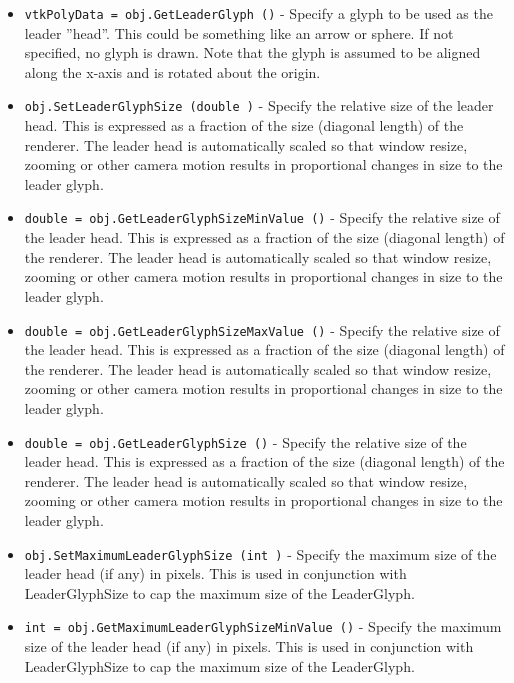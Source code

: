 \begin{itemize}
\item  \verb|vtkPolyData = obj.GetLeaderGlyph ()| -  Specify a glyph to be used as the leader ''head''. This could be something
 like an arrow or sphere. If not specified, no glyph is drawn. Note that
 the glyph is assumed to be aligned along the x-axis and is rotated about
 the origin.

\item  \verb|obj.SetLeaderGlyphSize (double )| -  Specify the relative size of the leader head. This is expressed as a
 fraction of the size (diagonal length) of the renderer. The leader
 head is automatically scaled so that window resize, zooming or other 
 camera motion results in proportional changes in size to the leader
 glyph.

\item  \verb|double = obj.GetLeaderGlyphSizeMinValue ()| -  Specify the relative size of the leader head. This is expressed as a
 fraction of the size (diagonal length) of the renderer. The leader
 head is automatically scaled so that window resize, zooming or other 
 camera motion results in proportional changes in size to the leader
 glyph.

\item  \verb|double = obj.GetLeaderGlyphSizeMaxValue ()| -  Specify the relative size of the leader head. This is expressed as a
 fraction of the size (diagonal length) of the renderer. The leader
 head is automatically scaled so that window resize, zooming or other 
 camera motion results in proportional changes in size to the leader
 glyph.

\item  \verb|double = obj.GetLeaderGlyphSize ()| -  Specify the relative size of the leader head. This is expressed as a
 fraction of the size (diagonal length) of the renderer. The leader
 head is automatically scaled so that window resize, zooming or other 
 camera motion results in proportional changes in size to the leader
 glyph.

\item  \verb|obj.SetMaximumLeaderGlyphSize (int )| -  Specify the maximum size of the leader head (if any) in pixels. This 
 is used in conjunction with LeaderGlyphSize to cap the maximum size of
 the LeaderGlyph.

\item  \verb|int = obj.GetMaximumLeaderGlyphSizeMinValue ()| -  Specify the maximum size of the leader head (if any) in pixels. This 
 is used in conjunction with LeaderGlyphSize to cap the maximum size of
 the LeaderGlyph.


\end{itemize}
